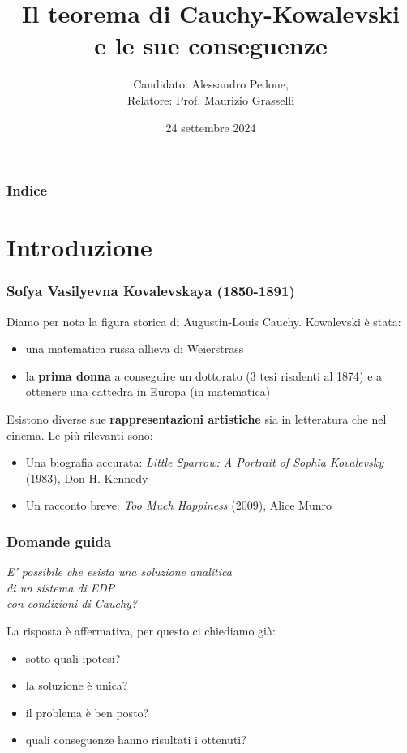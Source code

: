 \documentclass[serif,notheorems]{beamer}
\title{Il teorema di Cauchy-Kowalevski\\ e le sue conseguenze }
\author{Candidato: Alessandro Pedone,\\ Relatore: Prof. Maurizio Grasselli }
\institute{Politecnico di Milano}
\date{24 settembre 2024}
\theoremstyle{definition} %
\theoremstyle{remark}
\begin{document}
\frame{\titlepage}
\begin{frame}
    \frametitle{Indice}
    \tableofcontents
\end{frame}


\section{Introduzione}

\begin{frame}
\frametitle{Sofya Vasilyevna Kovalevskaya (1850-1891)}
Diamo per nota la figura storica di Augustin-Louis Cauchy. 
Kowalevski è stata:
\begin{itemize}
\item una matematica russa allieva di Weierstrass
\item la \textbf{prima donna} a conseguire un dottorato (3 tesi risalenti al 1874) e a ottenere una cattedra in Europa (in matematica)
\end{itemize}
\end{frame}

\begin{frame}
Esistono diverse sue \textbf{rappresentazioni artistiche} sia in letteratura che nel cinema. Le più rilevanti sono:
\begin{itemize}
\item Una biografia accurata: \textit{Little Sparrow: A Portrait of Sophia Kovalevsky} (1983), Don H. Kennedy
\item Un racconto breve: \textit{Too Much Happiness} (2009), Alice Munro
\end{itemize}
\end{frame}


\begin{frame}
\frametitle{Domande guida}
\begin{center}
\textit{ E' possibile che esista una soluzione analitica \\ di un sistema di EDP \\ con condizioni di Cauchy?}
\end{center}
\end{frame}

\begin{frame}
La risposta è affermativa, per questo ci chiediamo già: 
\begin{itemize}
\item sotto quali ipotesi?
\item la soluzione è unica?
\item il problema è ben posto?
\item quali conseguenze hanno risultati i ottenuti?
\end{itemize}
\end{frame}
\end{document}
